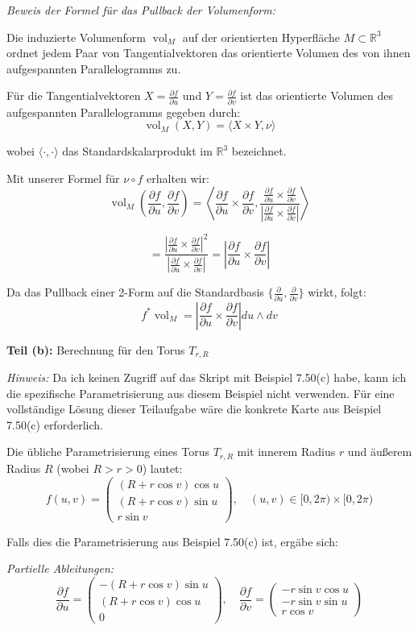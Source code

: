 \documentclass{article}
\DeclareMathOperator{\vol}{vol}
\newcommand{\R}{\mathbb{R}}
\newcommand{\del}{\partial}
\begin{document}
\textit{Beweis der Formel für das Pullback der Volumenform:}

Die induzierte Volumenform $\vol_M$ auf der orientierten Hyperfläche $M \subset \R^3$ ordnet jedem Paar von Tangentialvektoren das orientierte Volumen des von ihnen aufgespannten Parallelogramms zu.

Für die Tangentialvektoren $X = \frac{\del f}{\del u}$ und $Y = \frac{\del f}{\del v}$ ist das orientierte Volumen des aufgespannten Parallelogramms gegeben durch:
$$\vol_M(X, Y) = \langle X \times Y, \nu \rangle$$

wobei $\langle \cdot, \cdot \rangle$ das Standardskalarprodukt im $\R^3$ bezeichnet.

Mit unserer Formel für $\nu \circ f$ erhalten wir:
$$\vol_M\left(\frac{\del f}{\del u}, \frac{\del f}{\del v}\right) = \left\langle \frac{\del f}{\del u} \times \frac{\del f}{\del v}, \frac{\frac{\del f}{\del u} \times \frac{\del f}{\del v}}{\left|\frac{\del f}{\del u} \times \frac{\del f}{\del v}\right|} \right\rangle$$

$$= \frac{\left|\frac{\del f}{\del u} \times \frac{\del f}{\del v}\right|^2}{\left|\frac{\del f}{\del u} \times \frac{\del f}{\del v}\right|} = \left|\frac{\del f}{\del u} \times \frac{\del f}{\del v}\right|$$

Da das Pullback einer 2-Form auf die Standardbasis $\{\frac{\del}{\del u}, \frac{\del}{\del v}\}$ wirkt, folgt:
$$f^* \vol_M = \left| \frac{\del f}{\del u}\times\frac{\del f}{\del v} \right| du \wedge dv$$

\textbf{Teil (b):} Berechnung für den Torus $T_{r,R}$

\textit{Hinweis:} Da ich keinen Zugriff auf das Skript mit Beispiel 7.50(c) habe, kann ich die spezifische Parametrisierung aus diesem Beispiel nicht verwenden. Für eine vollständige Lösung dieser Teilaufgabe wäre die konkrete Karte aus Beispiel 7.50(c) erforderlich.

Die übliche Parametrisierung eines Torus $T_{r,R}$ mit innerem Radius $r$ und äußerem Radius $R$ (wobei $R > r > 0$) lautet:
$$f(u,v) = \begin{pmatrix}
(R + r\cos v)\cos u \\
(R + r\cos v)\sin u \\
r\sin v
\end{pmatrix}, \quad (u,v) \in [0,2\pi) \times [0,2\pi)$$

Falls dies die Parametrisierung aus Beispiel 7.50(c) ist, ergäbe sich:

\textit{Partielle Ableitungen:}
$$\frac{\del f}{\del u} = \begin{pmatrix}
-(R + r\cos v)\sin u \\
(R + r\cos v)\cos u \\
0
\end{pmatrix}, \quad
\frac{\del f}{\del v} = \begin{pmatrix}
-r\sin v \cos u \\
-r\sin v \sin u \\
r\cos v
\end{pmatrix}$$
\end{document}
